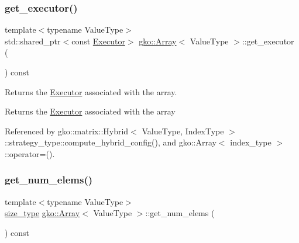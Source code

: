 \mbox{\label{classgko_1_1Array_a820e5930cb5072acc7673fdb2d11efcd}} 
\subsubsection{\texorpdfstring{get\+\_\+executor()}{get\_executor()}}
{\footnotesize\ttfamily template$<$typename Value\+Type$>$ \\
std\+::shared\+\_\+ptr$<$const \hyperlink{classgko_1_1Executor}{Executor}$>$ \hyperlink{classgko_1_1Array}{gko\+::\+Array}$<$ Value\+Type $>$\+::get\+\_\+executor (\begin{DoxyParamCaption}{ }\end{DoxyParamCaption}) const\hspace{0.3cm}{\ttfamily [noexcept]}}



Returns the \hyperlink{classgko_1_1Executor}{Executor} associated with the array. 

\begin{DoxyReturn}{Returns}
the \hyperlink{classgko_1_1Executor}{Executor} associated with the array 
\end{DoxyReturn}


Referenced by gko\+::matrix\+::\+Hybrid$<$ Value\+Type, Index\+Type $>$\+::strategy\+\_\+type\+::compute\+\_\+hybrid\+\_\+config(), and gko\+::\+Array$<$ index\+\_\+type $>$\+::operator=().

\mbox{\label{classgko_1_1Array_ad4a2aa179d350634e6579f144b6b2cf0}} 
\subsubsection{\texorpdfstring{get\+\_\+num\+\_\+elems()}{get\_num\_elems()}}
{\footnotesize\ttfamily template$<$typename Value\+Type$>$ \\
\hyperlink{namespacegko_a6e5c95df0ae4e47aab2f604a22d98ee7}{size\+\_\+type} \hyperlink{classgko_1_1Array}{gko\+::\+Array}$<$ Value\+Type $>$\+::get\+\_\+num\+\_\+elems (\begin{DoxyParamCaption}{ }\end{DoxyParamCaption}) const\hspace{0.3cm}{\ttfamily [noexcept]}}



